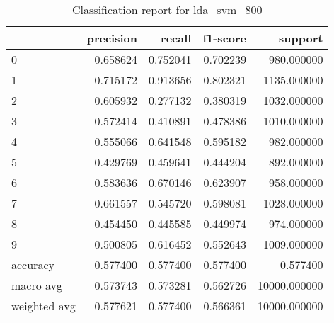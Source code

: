 \begin{table}[htb!]
\centering
\caption{Classification report for lda_svm_800}
\label{tab:classification-report-lda_svm_800}
\begin{tabular}{lrrrr}
\toprule
 & precision & recall & f1-score & support \\
\midrule
0 & 0.658624 & 0.752041 & 0.702239 & 980.000000 \\
1 & 0.715172 & 0.913656 & 0.802321 & 1135.000000 \\
2 & 0.605932 & 0.277132 & 0.380319 & 1032.000000 \\
3 & 0.572414 & 0.410891 & 0.478386 & 1010.000000 \\
4 & 0.555066 & 0.641548 & 0.595182 & 982.000000 \\
5 & 0.429769 & 0.459641 & 0.444204 & 892.000000 \\
6 & 0.583636 & 0.670146 & 0.623907 & 958.000000 \\
7 & 0.661557 & 0.545720 & 0.598081 & 1028.000000 \\
8 & 0.454450 & 0.445585 & 0.449974 & 974.000000 \\
9 & 0.500805 & 0.616452 & 0.552643 & 1009.000000 \\
accuracy & 0.577400 & 0.577400 & 0.577400 & 0.577400 \\
macro avg & 0.573743 & 0.573281 & 0.562726 & 10000.000000 \\
weighted avg & 0.577621 & 0.577400 & 0.566361 & 10000.000000 \\
\bottomrule
\end{tabular}
\end{table}
